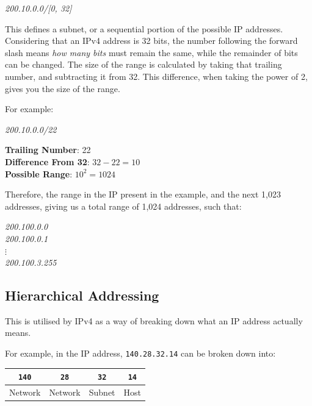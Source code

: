 \documentclass{article}
\begin{document}
\begin{center}
  \textit{200.10.0.0/[0, 32]}
\end{center}

This defines a subnet, or a sequential portion of the possible IP addresses. Considering that an IPv4
address is 32 bits, the number following the forward slash means \textit{how many bits} must remain the same, while the remainder of bits can be changed. The size of the range is calculated by taking that trailing number, and subtracting it from 32. This difference, when taking the power of 2, gives you the size of the range.

For example:

\begin{center}
  \textit{200.10.0.0/22}
\end{center}

\textbf{Trailing Number}: 22\\
\textbf{Difference From 32}: $32 - 22 = 10$\\
\textbf{Possible Range}: $10^2 = 1024$

Therefore, the range in the IP present in the example, and the next 1,023 addresses, giving us a total range of 1,024 addresses, such that:

\begin{center}
  \textit{
    200.100.0.0\\
    200.100.0.1\\
    $\vdots$\\
    200.100.3.255
  }
\end{center}

\subsection{Hierarchical Addressing}

This is utilised by IPv4 as a way of breaking down what an IP address actually means.

For example, in the IP address, \texttt{140.28.32.14} can be broken down into:

\begin{center}
  \begin{tabular}{|c|c|c|c|}
    \hline
    \texttt{140} & \texttt{28} & \texttt{32} & \texttt{14}\\
    \hline
    Network & Network & Subnet & Host\\
    \hline
  \end{tabular}
\end{center}
\end{document}
